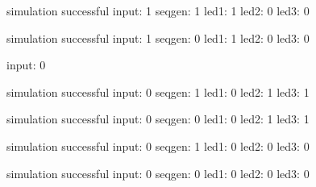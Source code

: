 \begin{itemize}
simulation successful
input: 1\newline
seqgen: 1\newline
led1: 1\newline
led2: 0\newline
led3: 0\newline

simulation successful
input: 1\newline
seqgen: 0\newline
led1: 1\newline
led2: 0\newline
led3: 0\newline

input: 0\newline

simulation successful
input: 0\newline
seqgen: 1\newline
led1: 0\newline
led2: 1\newline
led3: 1\newline

simulation successful
input: 0\newline
seqgen: 0\newline
led1: 0\newline
led2: 1\newline
led3: 1\newline

simulation successful
input: 0\newline
seqgen: 1\newline
led1: 0\newline
led2: 0\newline
led3: 0\newline

simulation successful
input: 0\newline
seqgen: 0\newline
led1: 0\newline
led2: 0\newline
led3: 0\newline



\end{itemize}


